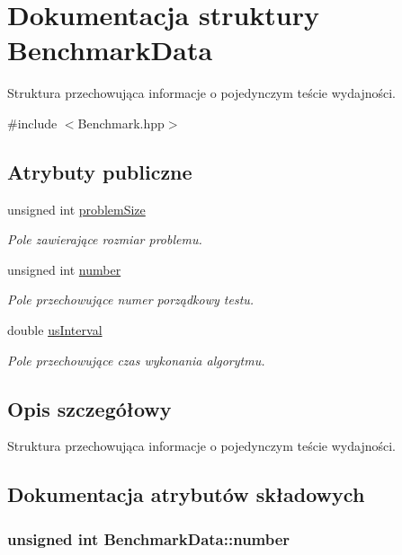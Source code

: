 \hypertarget{struct_benchmark_data}{\section{Dokumentacja struktury Benchmark\-Data}
\label{struct_benchmark_data}
}


Struktura przechowująca informacje o pojedynczym teście wydajności.  




{\ttfamily \#include $<$Benchmark.\-hpp$>$}

\subsection*{Atrybuty publiczne}
\begin{DoxyCompactItemize}
\item 
unsigned int \hyperlink{struct_benchmark_data_a0930dd7c614875360efdcea006b93ffd}{problem\-Size}
\begin{DoxyCompactList}\small\item\em Pole zawierające rozmiar problemu. \end{DoxyCompactList}\item 
unsigned int \hyperlink{struct_benchmark_data_aaebb6314bfa995ccaa9ad25c9f496c3f}{number}
\begin{DoxyCompactList}\small\item\em Pole przechowujące numer porządkowy testu. \end{DoxyCompactList}\item 
double \hyperlink{struct_benchmark_data_a4ca32898c190668bf63fd31a708199a9}{us\-Interval}
\begin{DoxyCompactList}\small\item\em Pole przechowujące czas wykonania algorytmu. \end{DoxyCompactList}\end{DoxyCompactItemize}


\subsection{Opis szczegółowy}
Struktura przechowująca informacje o pojedynczym teście wydajności. 



\subsection{Dokumentacja atrybutów składowych}
\hypertarget{struct_benchmark_data_aaebb6314bfa995ccaa9ad25c9f496c3f}{
\subsubsection[{number}]{\setlength{\rightskip}{0pt plus 5cm}unsigned int Benchmark\-Data\-::number}}\label{struct_benchmark_data_aaebb6314bfa995ccaa9ad25c9f496c3f}


